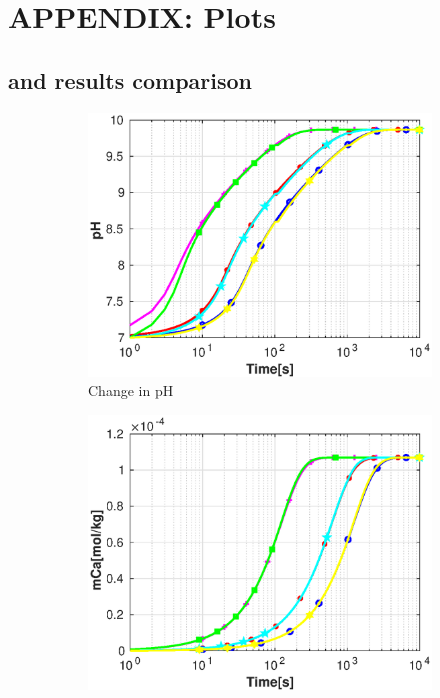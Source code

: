 \chapter{APPENDIX: Plots}\label{app:appendixB}
\thispagestyle{empty}
\section{\DuMuX and \MATLAB results comparison}

\begin{figure}
    \centering
    \begin{subfigure}{.5\linewidth}
            \centering
        \includegraphics[width=\textwidth]{PICTURES/dvm_pH7_pH.eps}
        \caption{\small Change in pH}
        \label{fig:dvmpH7pH}
    \end{subfigure}%
        \hfill
    \begin{subfigure}{.5\linewidth}
            \centering
        \includegraphics[width=\textwidth]{PICTURES/dvm_pH7_mCa.eps}

\end{subfigure}
\end{figure}

